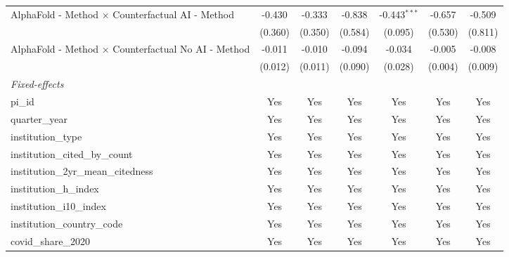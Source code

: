 \begin{tabular}{lcccccc}
   AlphaFold - Method $\times$ Counterfactual AI - Method      & -0.430        & -0.333        & -0.838         & -0.443$^{***}$ & -0.657      & -0.509\\   
                                                               & (0.360)       & (0.350)       & (0.584)        & (0.095)        & (0.530)     & (0.811)\\   
   AlphaFold - Method $\times$ Counterfactual No AI - Method   & -0.011        & -0.010        & -0.094         & -0.034         & -0.005      & -0.008\\   
                                                               & (0.012)       & (0.011)       & (0.090)        & (0.028)        & (0.004)     & (0.009)\\   
   \midrule
   \emph{Fixed-effects}\\
   pi\_id                                                      & Yes           & Yes           & Yes            & Yes            & Yes         & Yes\\  
   quarter\_year                                               & Yes           & Yes           & Yes            & Yes            & Yes         & Yes\\  
   institution\_type                                           & Yes           & Yes           & Yes            & Yes            & Yes         & Yes\\  
   institution\_cited\_by\_count                               & Yes           & Yes           & Yes            & Yes            & Yes         & Yes\\  
   institution\_2yr\_mean\_citedness                           & Yes           & Yes           & Yes            & Yes            & Yes         & Yes\\  
   institution\_h\_index                                       & Yes           & Yes           & Yes            & Yes            & Yes         & Yes\\  
   institution\_i10\_index                                     & Yes           & Yes           & Yes            & Yes            & Yes         & Yes\\  
   institution\_country\_code                                  & Yes           & Yes           & Yes            & Yes            & Yes         & Yes\\  
   covid\_share\_2020                                          & Yes           & Yes           & Yes            & Yes            & Yes         & Yes\\  

\end{tabular}
